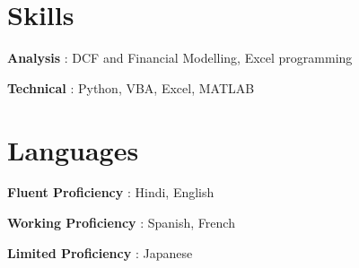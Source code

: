 \documentclass[10pt]{friggeri-cv}
\begin{document}
\section{Skills}
 \textbf{Analysis } :\textbf{ } DCF and Financial Modelling, Excel programming 
 
  \textbf{Technical } : Python, VBA, Excel, MATLAB 


\section{Languages}
 \textbf{Fluent Proficiency} : Hindi, English 
 
  \textbf{Working Proficiency} : Spanish, French 
 
  \textbf{Limited Proficiency} : Japanese 
\end{document}
